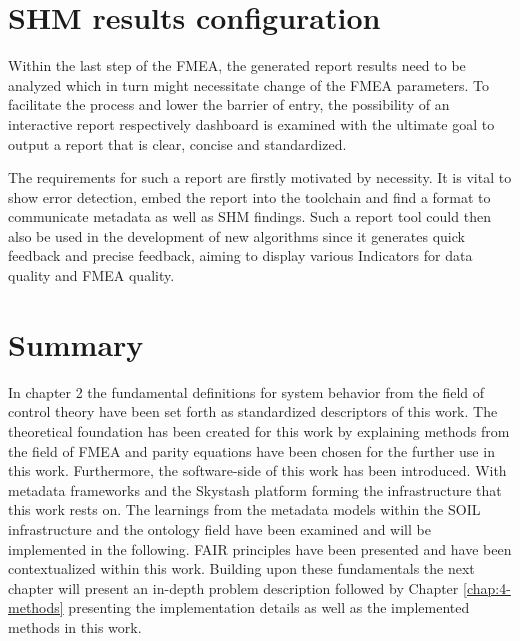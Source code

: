 \newpage


\section{SHM results configuration}

Within the last step of the FMEA, the generated report results need to be analyzed which in turn might necessitate change of the FMEA parameters. To facilitate the process and lower the barrier of entry, the possibility of an interactive report respectively dashboard is examined with the ultimate goal to output a report that is clear, concise and standardized.


The requirements for such a report are firstly motivated by necessity. It is vital to show error detection, embed the report into the toolchain and find a format to communicate metadata as well as SHM findings. Such a report tool could then also be used in the development of new algorithms since it generates quick feedback and precise feedback, aiming to display various Indicators for data quality and FMEA quality.


\section{Summary}
In chapter 2 the fundamental definitions for system behavior from the field of control theory have been set forth as standardized descriptors of this work. The theoretical foundation has been created for this work by explaining methods from the field of FMEA and parity equations have been chosen for the further use in this work. Furthermore, the software-side of this work has been introduced. With metadata frameworks and the Skystash platform forming the infrastructure that this work rests on. The learnings from the metadata models within the SOIL infrastructure and the ontology field have been examined and will be implemented in the following. FAIR principles have been presented and have been contextualized within this work. Building upon these fundamentals the next chapter will present an in-depth problem description followed by Chapter \ref{chap:4-methods} presenting the implementation details as well as the implemented methods in this work.




